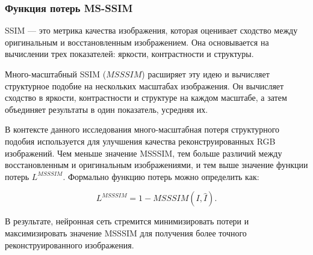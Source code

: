 \subsubsection{Функция потерь MS-SSIM}

SSIM — это метрика качества изображения, которая оценивает сходство между оригинальным и восстановленным изображением. Она основывается на вычислении трех показателей: яркости, контрастности и структуры.

Много-масштабный SSIM ($MSSSIM$) расширяет эту идею и вычисляет структурное подобие на нескольких масштабах изображения. Он вычисляет сходство в яркости, контрастности и структуре на каждом масштабе, а затем объединяет результаты в один показатель, усредняя их.

В контексте данного исследования много-масштабная потеря структурного подобия используется для улучшения качества реконструированных RGB изображений. Чем меньше значение MSSSIM, тем больше различий между восстановленным и оригинальным изображениями, и тем выше значение функции потерь $L^{MSSSIM}$. Формально функцию потерь можно определить как:

\begin{equation}
    \label{eq:2-1-3-3}
    L^{MSSSIM} = 1 - MSSSIM(I, \hat{I}).
\end{equation}

В результате, нейронная сеть стремится минимизировать потери и максимизировать значение MSSSIM для получения более точного реконструированного изображения.